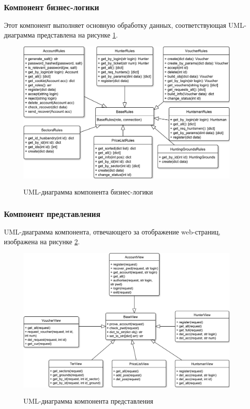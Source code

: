 		\subsubsection{Компонент бизнес-логики}
		Этот компонент выполняет основную обработку данных, соответствующая UML-диаграмма представлена на рисунке \ref{fig7:image}.
		
		\begin{figure}[ph!]
			\centering
			\begin{center}
				{\includegraphics[scale=0.6]{schemes/uml_business.pdf}}
				\caption{UML-диаграмма компонента бизнес-логики}
				\label{fig7:image}
			\end{center}
		\end{figure}
	
		\subsubsection{Компонент представления}
		UML-диаграмма компонента, отвечающего за отображение web-страниц, изображена на рисунке \ref{fig8:image}.
		
		\begin{figure}[pt!]
			\centering
			\begin{center}
				{\includegraphics[scale=0.6]{schemes/webGUI.pdf}}
				\caption{UML-диаграмма компонента представления}
				\label{fig8:image}
			\end{center}
		\end{figure}
		\newpage
	
